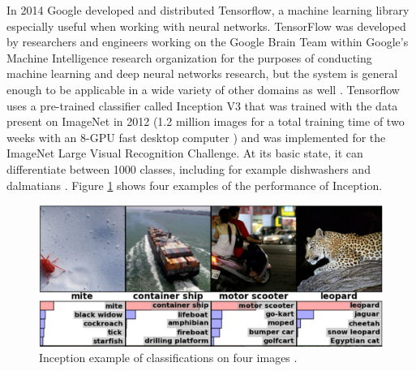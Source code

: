 \documentclass{l4proj}
\begin{document}
In 2014 Google developed and distributed Tensorflow, a machine learning library especially useful when working with neural networks. TensorFlow was developed by researchers and engineers working on the Google Brain Team within Google's Machine Intelligence research organization for the purposes of conducting machine learning and deep neural networks research, but the system is general enough to be applicable in a wide variety of other domains as well \cite{TensorFlow}. Tensorflow uses a pre-trained classifier called Inception V3 that was trained with the data present on ImageNet in 2012 (1.2 million images for a total training time of two weeks with an 8-GPU fast desktop computer \cite{Inception}) and was implemented for the ImageNet Large Visual Recognition Challenge. At its basic state, it can differentiate between 1000 classes, including for example dishwashers and dalmatians \cite{TensorFlowForPoets}. Figure \ref{DeepClassificationPicture} shows four examples of the performance of Inception.

\begin{figure}[h!]
\centering
\includegraphics[scale=0.4]{classification.png}
\caption{Inception example of classifications on four images \cite{TensorFlowClassification}.}
\label{DeepClassificationPicture}
\end{figure}
\end{document}
